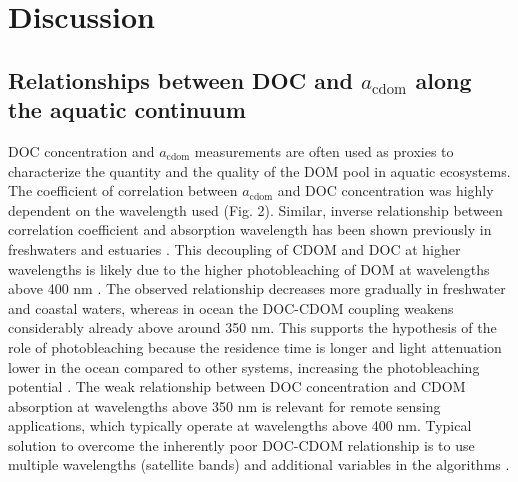 
\section*{Discussion}
\label{sec:Discussion}

\subsection*{Relationships between DOC and $a_{\text{cdom}}$ along the aquatic continuum}

DOC concentration and $a_{\text{cdom}}$ measurements are often used as proxies to characterize the quantity and the quality of the DOM pool in aquatic ecosystems. The coefficient of correlation between $a_{\text{cdom}}$ and DOC concentration was highly dependent on the wavelength used (Fig. 2). Similar, inverse relationship between correlation coefficient and absorption wavelength has been shown previously in freshwaters and estuaries \citep{Asmala2012, Peacock2014}. This decoupling of CDOM and DOC at higher wavelengths is likely due to the higher photobleaching of DOM at wavelengths above 400 nm \citep{Osburn2009}. The observed relationship decreases more gradually in freshwater and coastal waters, whereas in ocean the DOC-CDOM coupling weakens considerably already above around 350 nm. This supports the hypothesis of the role of photobleaching because the residence time is longer and light attenuation lower in the ocean compared to other systems, increasing the photobleaching potential \citep{DelVecchio2002, Swan2012, Nelson2013}. The weak relationship between DOC concentration and CDOM absorption at wavelengths above 350 nm is relevant for remote sensing applications, which typically operate at wavelengths above 400 nm. Typical solution to overcome the inherently poor DOC-CDOM relationship is to use multiple wavelengths (satellite bands) and additional variables in the algorithms \citep{DelCastillo2008, Mannino2008}.

